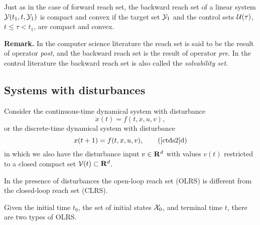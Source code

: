 Just as in the case of forward reach set, the backward reach set of
a linear system $\YY(t_1, t, \YY_1)$ is compact and convex if the target set $\YY_1$ and the control sets
$\UU(\tau)$, $t\leq\tau<t_1$, are compact and convex.

{\bf Remark.}
In the computer science literature the reach set is said to be the result
of operator \emph{post}, and the backward reach set is the result of
operator \emph{pre}.
In the control literature the backward reach set is also called the
\emph{solvability set}.
































\subsection{Systems with disturbances}\label{subsec_sysdist}
Consider the continuous-time dynamical system with disturbance
\begin{equation}
\dot{x}(t) = f(t, x, u, v),
\label{ctds2}
\end{equation}
or the discrete-time dynamical system with disturbance
\begin{equation}
x(t+1) = f(t, x, u, v),
\tag*{(\ref{ctds2}d)}
\label{dtds2}
\end{equation}
in which 
we also have the disturbance input $v\in{\bf R}^d$ with values $v(t)$  restricted
to a closed compact set $\VV(t)\subset{\bf R}^d$.

In the presence of disturbances the open-loop reach set (OLRS) is different from the
closed-loop reach set (CLRS).

Given the initial time $t_0$, the set of initial states $\XX_0$, and
terminal time $t$, there are two types of OLRS.

